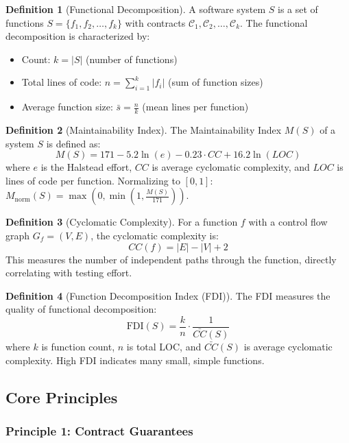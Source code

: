\documentclass[a4paper,12pt]{article}
\theoremstyle{definition}
\newtheorem{definition}{Definition}
\begin{document}
\begin{definition}[Functional Decomposition]
A software system $S$ is a set of functions $S = \{f_1, f_2, \ldots, f_k\}$ with contracts $\mathcal{C}_1, \mathcal{C}_2, \ldots, \mathcal{C}_k$. The functional decomposition is characterized by:
\begin{itemize}
	\item Count: $k = |S|$ (number of functions)
	\item Total lines of code: $n = \sum_{i=1}^{k} |f_i|$ (sum of function sizes)
	\item Average function size: $\bar{s} = \frac{n}{k}$ (mean lines per function)
\end{itemize}
\end{definition}

\begin{definition}[Maintainability Index]
The Maintainability Index $M(S)$ of a system $S$ is defined as:
\[
M(S) = 171 - 5.2 \ln(e) - 0.23 \cdot CC + 16.2 \ln(LOC)
\]
where $e$ is the Halstead effort, $CC$ is average cyclomatic complexity, and $LOC$ is lines of code per function. Normalizing to $[0, 1]$: $M_{\text{norm}}(S) = \max(0, \min(1, \frac{M(S)}{171}))$.
\end{definition}

\begin{definition}[Cyclomatic Complexity]
For a function $f$ with a control flow graph $G_f = (V, E)$, the cyclomatic complexity is:
\[
CC(f) = |E| - |V| + 2
\]
This measures the number of independent paths through the function, directly correlating with testing effort.
\end{definition}

\begin{definition}[Function Decomposition Index (FDI)]
The FDI measures the quality of functional decomposition:
\[
\mathrm{FDI}(S) = \frac{k}{n} \cdot \frac{1}{\bar{CC}(S)}
\]
where $k$ is function count, $n$ is total LOC, and $\bar{CC}(S)$ is average cyclomatic complexity. High FDI indicates many small, simple functions.
\end{definition}

\subsection{Core Principles}

\subsubsection{Principle 1: Contract Guarantees}
\end{document}
